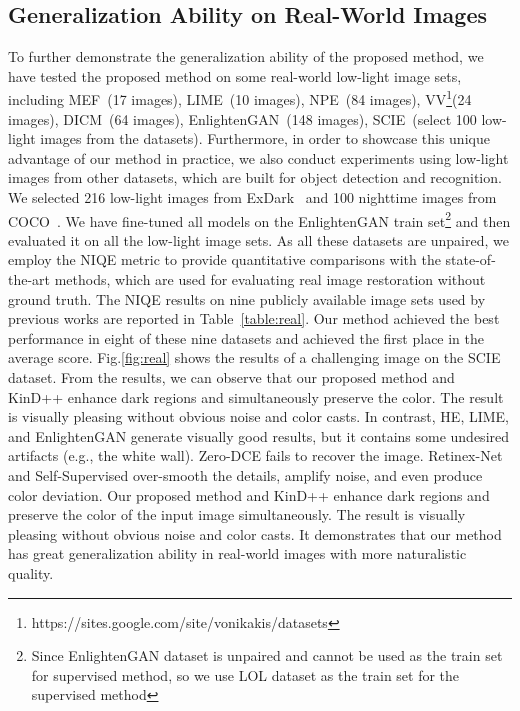 \documentclass[journal]{IEEEtran}
\begin{document}
\subsection{Generalization Ability on Real-World Images}
To further demonstrate the generalization ability of the proposed method, we have tested the proposed method on some real-world low-light image sets, including MEF~\cite{lee2011power}(17 images), LIME~\cite{guo2016lime}(10 images), NPE~\cite{wang2013naturalness}(84 images), VV\footnote{https://sites.google.com/site/vonikakis/datasets}(24 images), DICM~\cite{lee2013contrast}(64 images), EnlightenGAN~\cite{jiang2021enlightengan}(148 images), SCIE~\cite{cai2018learning}(select 100 low-light images from the datasets). Furthermore, in order to showcase this unique advantage of our method in practice, we also conduct experiments using low-light images from other datasets, which are built for object detection and recognition. We selected 216 low-light images from ExDark~\cite{loh2019getting} and 100 nighttime images from COCO~\cite{lin2014microsoft}. We have fine-tuned all models on the EnlightenGAN train set\footnote {Since EnlightenGAN dataset is unpaired and cannot be used as the train set for supervised method, so we use LOL dataset as the train set for the supervised method} and then evaluated it on all the low-light image sets. As all these datasets are unpaired, we employ the NIQE metric to provide quantitative comparisons with the state-of-the-art methods, which are used for evaluating real image restoration without ground truth. The NIQE results on nine publicly available image sets used by previous works are reported in Table~\ref{table:real}. Our method achieved the best performance in eight of these nine datasets and achieved the first place in the average score. Fig.\ref{fig:real} shows the results of a challenging image on the SCIE dataset. From the results, we can observe that our proposed method and KinD++ enhance dark regions and simultaneously preserve the color. The result is visually pleasing without obvious noise and color casts. In contrast, HE, LIME, and EnlightenGAN generate visually good results, but it contains some undesired artifacts (e.g., the white wall). Zero-DCE fails to recover the image. Retinex-Net and Self-Supervised over-smooth the details, amplify noise, and even produce color deviation. Our proposed method and KinD++ enhance dark regions and preserve the color of the input image simultaneously. The result is visually pleasing without obvious noise and color casts. It demonstrates that our method has great generalization ability in real-world images with more naturalistic quality.
\end{document}

